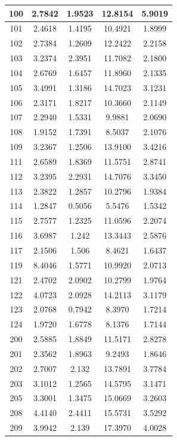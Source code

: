 \begin{table}[!tp]
\begin{tabular}{|c|c|c|c|c|}
		100 & 2.7842 & 1.9523 & 12.8154 & 5.9019\\ \hline
		101 & 2.4618 & 1.4195 & 10.4921 & 1.8999\\ \hline
		102 & 2.7384 & 1.2609 & 12.2422 & 2.2158\\ \hline
		103 & 3.2374 & 2.3951 & 11.7082 & 2.1800\\ \hline
		104 & 2.6769 & 1.6457 & 11.8960 & 2.1335\\ \hline
		105 & 3.4991 & 1.3186 & 14.7023 & 3.1231\\ \hline
		106 & 2.3171 & 1.8217 & 10.3660 & 2.1149\\ \hline
		107 & 2.2940 & 1.5331 &  9.9881 & 2.0690\\ \hline
		108 & 1.9152 & 1.7391 &  8.5037 & 2.1076\\ \hline
		109 & 3.2367 & 1.2506 & 13.9100 & 3.4216\\ \hline
		111 & 2.6589 & 1.8369 & 11.5751 & 2.8741\\ \hline
		112 & 3.2395 & 2.2931 & 14.7076 & 3.3450\\ \hline
		113 & 2.3822 & 1.2857 & 10.2796 & 1.9384\\ \hline
		114 & 1.2847 & 0.5056 &  5.5476 & 1.5342\\ \hline
		115 & 2.7577 & 1.2325 & 11.0596 & 2.2074\\ \hline
		116 & 3.6987 & 1.242  & 13.3443 & 2.5876\\ \hline
		117 & 2.1506 & 1.506  &  8.4621 & 1.6437\\ \hline
		119 & 8.4046 & 1.5771 & 10.9920 & 2.0713\\ \hline
		121 & 2.4702 & 2.0902 & 10.2799 & 1.9764\\ \hline
		122 & 4.0723 & 2.0928 & 14.2113 & 3.1179\\ \hline
		123 & 2.0768 & 0.7942 &  8.3970 & 1.7214\\ \hline
		124 & 1.9720 & 1.6778 &  8.1376 & 1.7144\\ \hline
		200 & 2.5885 & 1.8849 & 11.5171 & 2.8278\\ \hline
		201 & 2.3562 & 1.8963 &  9.2493 & 1.8646\\ \hline
		202 & 2.7007 & 2.132  & 13.7891 & 3.7784\\ \hline
		203 & 3.1012 & 1.2565 & 14.5795 & 3.1471\\ \hline
		205 & 3.3001 & 1.3475 & 15.0669 & 3.2603\\ \hline
		208 & 4.4140 & 2.4411 & 15.5731 & 3.5292\\ \hline
		209 & 3.9942 & 2.139  & 17.3970 & 4.0028\\ \hline	

\end{tabular}
\end{table}
